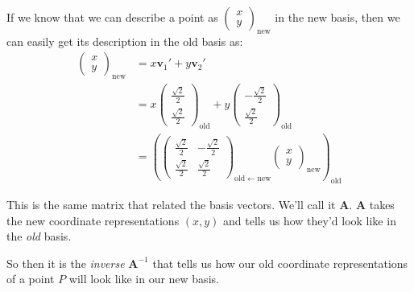 	If we know that we can describe a point as $\begin{pmatrix}
					x \\ y
		\end{pmatrix}_{\text{new}}$
	in the new basis, then we can easily get its description in the old basis as:
	\begin{equation}\label{eq:ContravariantTransform}
		\begin{aligned}
			\begin{pmatrix}
						x \\ y
			\end{pmatrix}_{\mathrm{new}} 
			&= x \mathbf v_1' + y \mathbf v_2' \\
			&= x \begin{pmatrix}
				\frac{\sqrt 2}{2} \\ \frac{\sqrt 2}{2}
			\end{pmatrix}_{\mathrm{old}} 
			+ y \begin{pmatrix}
				-\frac{\sqrt 2}{2} \\ \frac{\sqrt 2}{2}
			\end{pmatrix}_{\mathrm{old}}
			\\ &=\left( \begin{pmatrix}
				 \frac{\sqrt 2}{2} &  -\frac{\sqrt 2}{2} \\
				 \frac{\sqrt 2}{2} &  \frac{\sqrt 2}{2}
			\end{pmatrix}_{\mathrm{old} \leftarrow \mathrm{new}}
			\begin{pmatrix}
						x \\ y
			\end{pmatrix}_{\mathrm{new}} \right)_{\mathrm{old}} 
		\end{aligned}
	\end{equation}
	
	This is the same matrix that related the basis vectors. We'll call it $\mathbf A$. $\mathbf A$ takes the new coordinate representations $(x,y)$ and tells us how they'd look like in the \emph{old} basis. 

	
	So then it is the \emph{inverse} $\mathbf A^{-1}$ that tells us how our old coordinate representations of a point $P$ will look like in our new basis.
	
